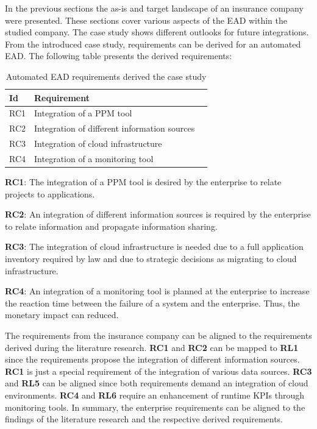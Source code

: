 In the previous sections the as-is and target landscape of an insurance company were presented. These sections cover various aspects of the EAD within the studied company. The case study shows different outlooks for future integrations. From the introduced case study, requirements can be derived for an automated EAD. The following table presents the derived requirements:

\begin{table}[htpb]
  \caption[Automated EAD requirements derived from the case study]{Automated EAD requirements derived the case study}\label{tab:casestudyrequirements}
  \centering
  \begin{tabular}{l l l}
    \toprule
      Id & Requirement\\
    \midrule
      RC1 & Integration of a PPM tool\\
      RC2 & Integration of different information sources\\
      RC3 & Integration of cloud infrastructure\\
      RC4 & Integration of a monitoring tool\\
    \bottomrule
  \end{tabular}
\end{table}

\textbf{RC1}: The integration of a PPM tool is desired by the enterprise to relate projects to applications.

\textbf{RC2}: An integration of different information sources is required by the enterprise to relate information and propagate information sharing.

\textbf{RC3}: The integration of cloud infrastructure is needed due to a full application inventory required by law and due to strategic decisions as migrating to cloud infrastructure.

\textbf{RC4}: An integration of a monitoring tool is planned at the enterprise to increase the reaction time between the failure of a system and the enterprise. Thus, the monetary impact can reduced.

The requirements from the insurance company  can be aligned to the requirements derived during the literature research. \textbf{RC1} and \textbf{RC2} can be mapped to \textbf{RL1} since the requirements propose the integration of different information sources. \textbf{RC1} is just a special requirement of the integration of various data sources. \textbf{RC3} and \textbf{RL5} can be aligned since both requirements demand an integration of cloud environments. \textbf{RC4} and \textbf{RL6} require an enhancement of runtime KPIs through monitoring tools.
In summary, the enterprise requirements can be aligned to the findings of the literature research and the respective derived requirements. 

